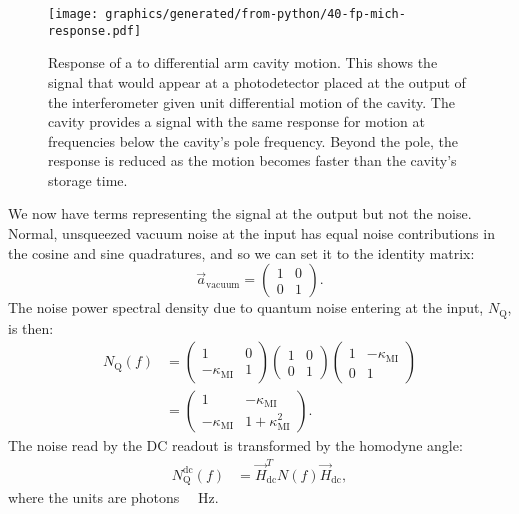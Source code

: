 \begin{figure}
  \centering
  \texttt{[image: graphics/generated/from-python/40-fp-mich-response.pdf]}
  \caption[Response of a \FPMI{} to differential arm cavity motion]{\label{fig:fp-mich-response}Response of a \FPMI{} to differential arm cavity motion. This shows the signal that would appear at a photodetector placed at the output of the interferometer given unit differential motion of the cavity. The cavity provides a signal with the same response for motion at frequencies below the cavity's pole frequency. Beyond the pole, the response is reduced as the motion becomes faster than the cavity's storage time.}
\end{figure}

We now have terms representing the signal at the output but not the noise. Normal, unsqueezed vacuum noise at the input has equal noise contributions in the cosine and sine quadratures, and so we can set it to the identity matrix:
\begin{equation}
  \label{eq:unsqueezed-vacuum-amplitude}
  \vec{a}_{\text{vacuum}} =
  \begin{pmatrix}
   1 & 0 \\
   0 & 1
  \end{pmatrix}.
\end{equation}
The noise power spectral density due to quantum noise entering at the input, $N_{\text{Q}}$, is then:
\begin{equation}
  \begin{split}
    N_{\text{Q}} \left( f \right) &=
    \begin{pmatrix}
      1 & 0 \\
      -\kappa_{\text{MI}} & 1
    \end{pmatrix}
    \begin{pmatrix}
      1 & 0 \\
      0 & 1
    \end{pmatrix}
    \begin{pmatrix}
      1 & -\kappa_{\text{MI}} \\
      0 & 1
    \end{pmatrix} \\
    &=
    \begin{pmatrix}
      1 & -\kappa_{\text{MI}} \\
      -\kappa_{\text{MI}} & 1 + \kappa^2_{\text{MI}}
    \end{pmatrix}.
  \end{split}
\end{equation}
The noise read by the \gls{DC} readout is transformed by the homodyne angle:
\begin{equation}
  \begin{split}
    N_{\text{Q}}^{\text{dc}} \left( f \right) &= \vec{H}_{\text{dc}}^{T} N \left( f \right) \vec{H}_{\text{dc}},
  \end{split}
\end{equation}
where the units are photons \SI{}{\per\hertz}.

